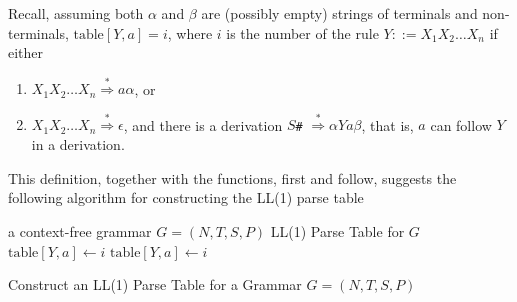 \documentclass[8pt,a4paper,compress,handout]{beamer}
\newcommand{\derives}{\stackrel{*}{\Rightarrow}}
\begin{document}
\begin{frame}[fragile]
\pause

Recall, assuming both $\alpha$ and $\beta$ are (possibly empty) strings of terminals and non-terminals, $\text{table}[Y, a] = i$, where $i$ is the number of the rule $Y ::= X_1X_2 \dots X_n$ if either

\begin{enumerate}
\item $X_1X_2 \dots X_n \derives a\alpha$, or
\item $X_1X_2 \dots X_n \derives \epsilon$, and there is a derivation $S$\lstinline{#} $\derives \alpha Ya\beta$, that is, $a$ can follow $Y$ in a derivation.
\end{enumerate}

This definition, together with the functions, first and follow, suggests the following algorithm for constructing the LL(1) parse table

\begin{algorithm}[H]
\begin{algorithmic}
\REQUIRE a context-free grammar $G=(N,T,S,P)$
\ENSURE LL(1) Parse Table for $G$
\STATE $\text{table}[Y, a] \gets i$
\STATE $\text{table}[Y, a] \gets i$
\ENDFOR
\ENDIF
\ENDFOR
\ENDFOR
\ENDFOR
\end{algorithmic}
\caption{Construct an LL(1) Parse Table for a Grammar $G=(N,T,S,P)$}
\end{algorithm}
\end{frame}
\end{document}
